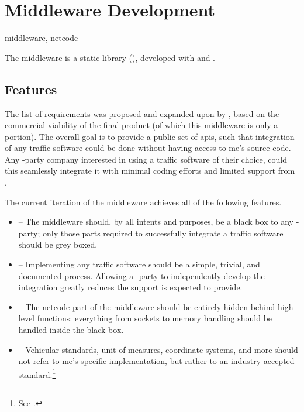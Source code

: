 \chapter{Middleware Development}\label{ch:middleware}

\begin{keywords}
	middleware, netcode %
\end{keywords}

The \gls{middleware} is a  static library (), developed with  and .

\section{Features}\label{sc:middleware:features}

The list of requirements was proposed and expanded upon by , based on the commercial viability of the final product (of which this \gls{middleware} is only a portion). The overall goal is to provide a public set of \glspl{api}, such that integration of any traffic software could be done without having access to \gls{me}'s source code. Any -party company interested in using a traffic software of their choice, could this seamlessly integrate it with minimal coding efforts and limited support from .

The current iteration of the \gls{middleware} achieves all of the following \glspl{feature}.

\begin{itemize}
	\item {} -- The \gls{middleware} should, by all intents and purposes, be a black box to any -party; only those parts required to successfully integrate a traffic software should be grey boxed.
	\item {} -- Implementing any traffic software should be a simple, trivial, and documented process. Allowing a -party to independently develop the integration greatly reduces the support  is expected to provide.
	\item {} -- The \gls{netcode} part of the \gls{middleware} should be entirely hidden behind high-level functions: everything from sockets to memory handling should be handled inside the black box.
	\item {} -- Vehicular standards, unit of measures, coordinate systems, and more should not refer to \gls{me}'s specific implementation, but rather to an industry accepted standard.\footnote{See .}
\end{itemize}

